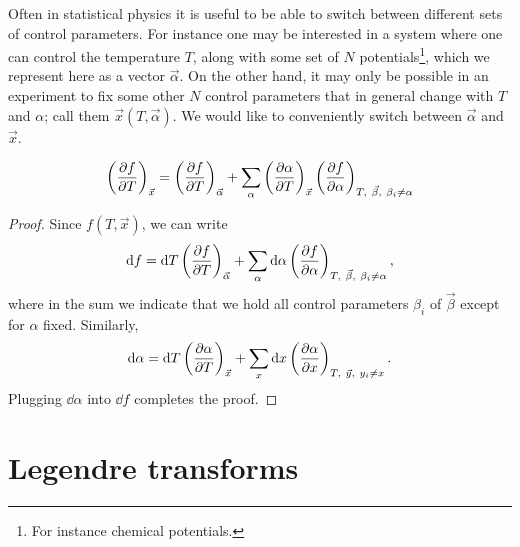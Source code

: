Often in statistical physics it is useful to be able to switch between different
sets of control parameters. For instance one may be interested in a system where
one can control the temperature $T$, along with some set of $N$
potentials\footnote{For instance chemical potentials.},
which we represent here as a vector $\vec\alpha$. On the other hand, it may only
be possible in an experiment to fix some other $N$ control parameters that in
general change with $T$ and $\alpha$; call them $\vec{x}(T,\vec\alpha)$. We
would like to conveniently switch between $\vec\alpha$ and $\vec{x}$.

\begin{proposition}{}{}
\begin{equation*}
\left( \pdv{f}{T} \right)_{\vec{x}} =  \left(\pdv{f}{T}\right)_{\vec\alpha}
+\sum_\alpha 
\left(\pdv{\alpha}{T}\right)_{\vec{x}}
\left(\pdv{f}{\alpha}\right)_{T,~\vec{\beta},~\beta_i\neq\alpha} 
\end{equation*}
\begin{proof}
Since $f(T,\vec{x})$, we can write
\begin{equation*}
\dd f=\dd{T} \left( \pdv{f}{T} \right)_{\vec{\alpha}} 
+ \sum_\alpha\dd\alpha\left(\pdv{f}{\alpha}\right)_{T,~\vec{\beta},~\beta_i\neq\alpha},
\end{equation*}
where in the sum we indicate that we hold all control parameters $\beta_i$ of
$\vec{\beta}$ except for $\alpha$ fixed. Similarly,
\begin{equation*}
\dd\alpha=\dd{T} \left( \pdv{\alpha}{T} \right)_{\vec{x}} 
+ \sum_x\dd x\left(\pdv{\alpha}{x}\right)_{T,~\vec{y},~y_i\neq x}.
\end{equation*}
Plugging $\dd \alpha$ into $\dd f$ completes the proof.
\end{proof}
\end{proposition}




\section{Legendre transforms}

